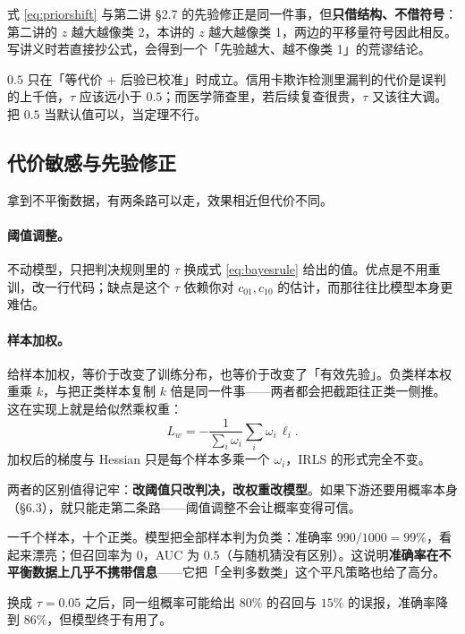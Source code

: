 \documentclass[11pt,a4paper,fontset=windows,zihao=-4]{ctexart}
\begin{document}
式 \eqref{eq:priorshift} 与第二讲 \S2.7 的先验修正是同一件事，但\textbf{只借结构、不借符号}：第二讲的 $z$ 越大越像类 2，本讲的 $z$ 越大越像类 1，两边的平移量符号因此相反。写讲义时若直接抄公式，会得到一个「先验越大、越不像类 1」的荒谬结论。

\begin{warn}[阈值 $0.5$ 不是定理]
$0.5$ 只在「等代价 + 后验已校准」时成立。信用卡欺诈检测里漏判的代价是误判的上千倍，$\tau$ 应该远小于 $0.5$；而医学筛查里，若后续复查很贵，$\tau$ 又该往大调。把 $0.5$ 当默认值可以，当定理不行。
\end{warn}

\subsection{代价敏感与先验修正}

拿到不平衡数据，有两条路可以走，效果相近但代价不同。

\paragraph{阈值调整。}不动模型，只把判决规则里的 $\tau$ 换成式 \eqref{eq:bayesrule} 给出的值。优点是不用重训，改一行代码；缺点是这个 $\tau$ 依赖你对 $c_{01},c_{10}$ 的估计，而那往往比模型本身更难估。

\paragraph{样本加权。}给样本加权，等价于改变了训练分布，也等价于改变了「有效先验」。负类样本权重乘 $k$，与把正类样本复制 $k$ 倍是同一件事——两者都会把截距往正类一侧推。这在实现上就是给似然乘权重：
\begin{equation}
  L_w=-\frac{1}{\sum_i\omega_i}\sum_{i}\omega_i\,\ell_i .
\end{equation}
加权后的梯度与 Hessian 只是每个样本多乘一个 $\omega_i$，IRLS 的形式完全不变。

两者的区别值得记牢：\textbf{改阈值只改判决，改权重改模型}。如果下游还要用概率本身（\S6.3），就只能走第二条路——阈值调整不会让概率变得可信。

\begin{exm}
一千个样本，十个正类。模型把全部样本判为负类：准确率 $990/1000=99\%$，看起来漂亮；但召回率为 $0$，AUC 为 $0.5$（与随机猜没有区别）。这说明\textbf{准确率在不平衡数据上几乎不携带信息}——它把「全判多数类」这个平凡策略也给了高分。

换成 $\tau=0.05$ 之后，同一组概率可能给出 $80\%$ 的召回与 $15\%$ 的误报，准确率降到 $86\%$，但模型终于有用了。
\end{exm}
\end{document}
